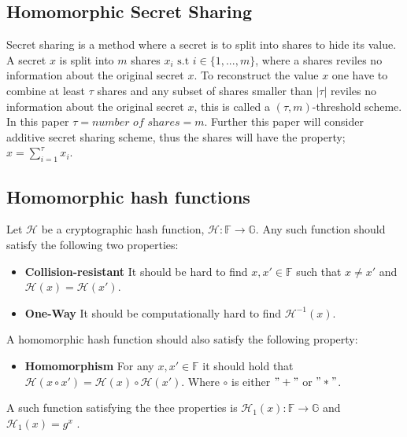 \subsection*{Homomorphic Secret Sharing}
Secret sharing \cite{How_share_A_secret} is a method where a secret is to split  into shares to hide its value. A secret $x$ is split into $m$ shares $x_i \text{ s.t } i\in\{1,...,m\}$, where a shares reviles no information about the original secret $x$. To reconstruct the value $x$ one have to combine at least $\tau$ shares and any subset of shares smaller than $|\tau|$ reviles no information about the original secret $x$, this is called a $(\tau,m)$-threshold scheme. In this paper $\tau = \textit{number of shares}=m$. Further this paper will consider additive secret sharing scheme, thus the shares will have the property; $x = \sum_{i=1}^\tau x_i$. 

\subsection*{Homomorphic hash functions}
Let $\mathcal{H}$ be a cryptographic hash function, $\mathcal{H}:\mathds{F}\to \mathds{G}$. Any such function should satisfy the following two properties:
\begin{itemize}
    \item \textbf{Collision-resistant} It should be hard to find $x,x'\in\mathds{F}$ such that $x\neq x'$ and $\mathcal{H}(x)=\mathcal{H}(x')$.
    \item \textbf{One-Way} It should be computationally hard to find $\mathcal{H}^{-1}(x)$.
\end{itemize}

A homomorphic hash function should also satisfy the following property:
\begin{itemize}
    \item \textbf{Homomorphism} For any $x,x'\in\mathds{F}$ it should hold that $\mathcal{H}(x\circ x') = \mathcal{H}(x)\circ\mathcal{H}(x')$. Where $\circ$ is either $"+"$ or $"*"$.
\end{itemize}

A such function satisfying the thee properties is $\mathcal{H}_1(x):\mathds{F}\to\mathds{G}$ and $\mathcal{H}_1(x)= g^{x}$ \cite{HHF}. 
